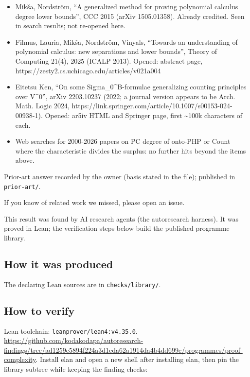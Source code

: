 \documentclass{article}
\begin{document}
\begin{itemize}
\item Mikša, Nordström, ``A generalized method for proving polynomial calculus degree lower bounds'', CCC 2015 (arXiv 1505.01358). Already credited. Seen in search results; not re-opened here.
\item Filmus, Lauria, Mikša, Nordström, Vinyals, ``Towards an understanding of polynomial calculus: new separations and lower bounds'', Theory of Computing 21(4), 2025 (ICALP 2013). Opened: abstract page, https://zesty2.cs.uchicago.edu/articles/v021a004
\item Eitetsu Ken, ``On some Sigma\_0\textasciicircum{}B-formulae generalizing counting principles over V\textasciicircum{}0'', arXiv 2203.10237 (2022; a journal version appears to be Arch. Math. Logic 2024, https://link.springer.com/article/10.1007/s00153-024-00938-1). Opened: ar5iv HTML and Springer page, first \textasciitilde{}100k characters of each.
\item Web searches for 2000-2026 papers on PC degree of onto-PHP or Count where the characteristic divides the surplus: no further hits beyond the items above.
\end{itemize}

Prior-art answer recorded by the owner (basis stated in the file); published in \texttt{prior-art/}.

If you know of related work we missed, please open an issue.

This result was found by AI research agents (the autoresearch harness). It was proved in Lean; the verification steps below build the published programme library.

\subsection*{How it was produced}

The declaring Lean sources are in \texttt{checks/library/}.

\subsection*{How to verify}

Lean toolchain: \texttt{leanprover/lean4:v4.35.0}. \url{https://github.com/kodakodapa/autoresearch-findings/tree/ad1259e5894f224a3d1eda62a1914da4b4dd699e/programmes/proof-complexity}. Install elan and open a new shell after installing elan, then pin the library subtree while keeping the finding checks:
\end{document}
